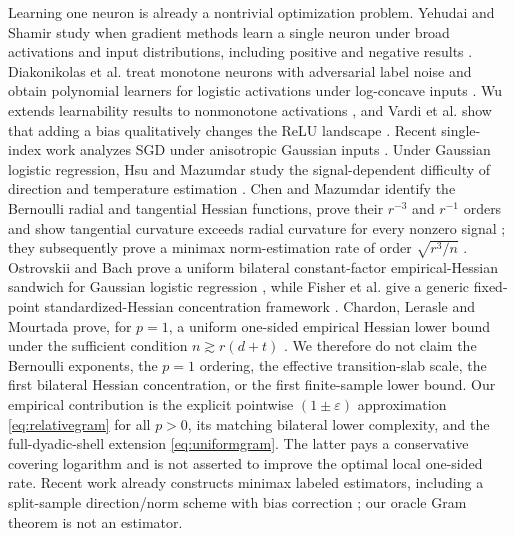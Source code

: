 \documentclass[11pt]{article}
\begin{document}
Learning one neuron is already a nontrivial optimization problem.  Yehudai and Shamir study when gradient methods
learn a single neuron under broad activations and input distributions, including positive and negative results
\cite{yehudai2020}.  Diakonikolas et al. treat monotone neurons with adversarial label noise and obtain polynomial
learners for logistic activations under log-concave inputs \cite{diakonikolas2022}.  Wu extends learnability results to
nonmonotone activations \cite{wu2022}, and Vardi et al. show that adding a bias qualitatively changes the ReLU
landscape \cite{vardi2021}.  Recent single-index work analyzes SGD under anisotropic Gaussian inputs
\cite{braun2025}.  Under Gaussian logistic regression, Hsu and Mazumdar study the signal-dependent difficulty of
direction and temperature estimation \cite{hsu2024}.  Chen and Mazumdar identify the Bernoulli radial and
tangential Hessian functions, prove their $r^{-3}$ and $r^{-1}$ orders and show tangential curvature exceeds radial
curvature for every nonzero signal \cite{chen2026gd}; they subsequently prove a minimax norm-estimation rate of
order $\sqrt{r^3/n}$ \cite{chen2026minimax}.  Ostrovskii and Bach prove a uniform bilateral constant-factor
empirical-Hessian sandwich for Gaussian logistic regression \cite[Eq.~(92)]{ostrovskii2021}, while Fisher et al.
give a generic fixed-point standardized-Hessian concentration framework \cite{fisher2023}.  Chardon, Lerasle and
Mourtada prove, for $p=1$, a uniform one-sided empirical Hessian lower bound under the sufficient condition
$n\gtrsim r(d+t)$ \cite[Theorem 6]{chardon2024}.  We therefore do not claim the Bernoulli exponents, the $p=1$
ordering, the effective transition-slab scale, the first bilateral Hessian concentration, or the first finite-sample
lower bound.  Our empirical contribution is the explicit pointwise $(1\pm\varepsilon)$ approximation
\eqref{eq:relativegram} for all $p>0$, its matching bilateral lower complexity, and the full-dyadic-shell extension
\eqref{eq:uniformgram}.  The latter pays a conservative covering logarithm and is not asserted to improve the
optimal local one-sided rate.  Recent work already constructs minimax labeled estimators, including a split-sample
direction/norm scheme with bias correction \cite{chen2026minimax}; our oracle Gram theorem is not an estimator.
\end{document}
